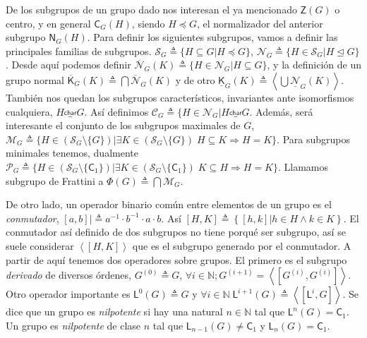 \documentclass[12pt,a4paper,fleqn,spanish,final,openright]{extbook}
\theoremstyle{definition}
\theoremstyle{remark}
\begin{document}
De los subgrupos de un grupo dado nos interesan el ya mencionado $\mathsf{Z}(G)$
o centro, y en general $\mathsf{C}_{G}(H)$, siendo $H    \preccurlyeq    G$,
el normalizador del anterior subgrupo $\mathsf{N}_{G}(H)$. Para definir
los siguientes subgrupos, vamos a definir las principales familias
de subgrupos.
$\mathcal{S}_{G}\triangleq\lbrace H    \subseteq G\vert H    \preccurlyeq    G\rbrace$,
$\mathcal{N}_{G}\triangleq\lbrace H    \in \mathcal{S}_{G}|H\trianglelefteq G\rbrace$.
Desde aquí podemos definir
$\mathcal{\overline N}_{G}(K)\triangleq\lbrace H    \in \mathcal{N}_{G}\vert H   \subseteq G\rbrace$,
y la definición de un grupo normal
${\overline{\mathsf{K}}}_{G}(K)\triangleq\bigcap\mathcal{\overline N}_{G}(K)$
y de otro
${\underline{\mathsf{K}}}_{G}(K)\triangleq\left\langle\bigcup\mathcal{\underline N}_{G}(K)\right\rangle$.
También nos quedan los subgrupos característicos, invariantes ante
isomorfismos cualquiera, $ H \overset{\mathsf{{char}}}{\_} G $. Así definimos
$\mathcal{C}_{G}\triangleq\lbrace H    \in \mathcal{N}_{G} \vert H \overset{\mathsf{{char}}}{\_} G$.
Además, será interesante el conjunto de los subgrupos maximales de $G$,
$\mathcal{M}_{G} \triangleq
\lbrace H    \in \left({\mathcal{S}_{G}}\setminus \lbrace G\rbrace\right) \vert
   \exists    K   \in \left({\mathcal{S}_{G}}\setminus \lbrace G\rbrace\right)\;
H    \subseteq K    \Rightarrow    H=K\rbrace$.
Para subgrupos minimales tenemos, dualmente
$\mathcal{P}_{G} \triangleq
\lbrace H    \in \left({\mathcal{S}_{G}}\setminus \lbrace \mathsf{C}_{1}\rbrace\right)
\vert    \exists    K    \in \left({\mathcal{S}_{G}}\setminus \lbrace
\mathsf{C}_{1}\rbrace\right)\; K    \subseteq H    \Rightarrow    H=K\rbrace$.
Llamamos subgrupo de Frattini a $\Phi (G)\triangleq \bigcap \mathcal{M}_{G}$.

De otro lado, un operador binario común entre elementos de un grupo es el \emph{conmutador},
$\left[ a,b \right] |\triangleq a^{-1}    \cdot b^{-1}    \cdot a    \cdot b$.
Así $\left[{H,K}\right]\triangleq \left\lbrace\left[ h,k \right]
\vert h     \in H    \wedge    k    \in K\right\rbrace $.
El conmutador así definido de dos subgrupos no tiene porqué
ser subgrupo, así se suele considerar $\left\langle{\left[{H,K}\right]}\right\rangle$
que es el subgrupo generado por el conmutador. A partir de aquí tenemos dos operadores
sobre grupos. El primero es el subgrupo \emph{derivado} de diversos órdenes,
$G^{(0)}\triangleq G$, $\forall i    \in \mathds{N}; G^{(i+1)}=
\left\langle\left[ G^{(i)},G^{(i)}\right]\right\rangle$.
Otro operador importante es $\mathsf{L}^{0}(G)\triangleq G$ y $\forall i    \in \mathds{N}\;
\mathsf{L}^{i+1}(G)\triangleq \left\langle\left[{\mathsf{L}^{i},G }\right]\right\rangle$.
Se dice que un grupo es \emph{nilpotente} si hay una natural $n    \in \mathds{N}$ tal que
$\mathsf{L}^{n}(G)=\mathsf{C}_{1}$. Un grupo es \emph{nilpotente} de clase $n$ tal que
$\mathsf{L}_{n-1}(G)    \neq    \mathsf{C}_1$ y $\mathsf{L}_{n}(G)=\mathsf{C}_1$.
\end{document}
